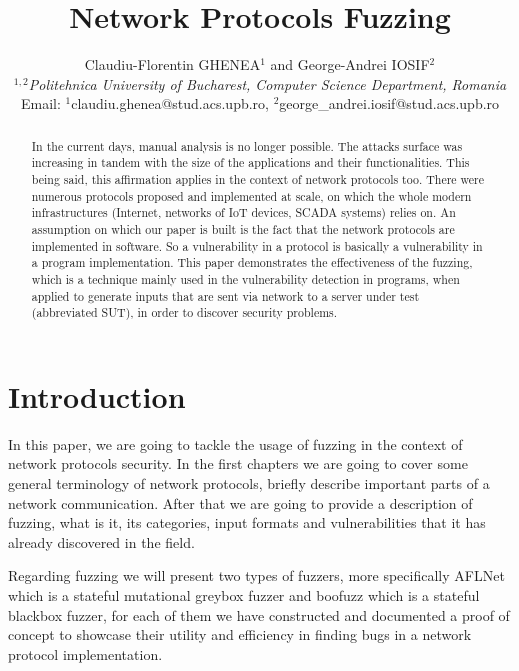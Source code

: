 \documentclass[10pt,a4paper,english,onecolumn]{IEEEtran}
\begin{document}
\title{Network Protocols Fuzzing}

\author{Claudiu-Florentin GHENEA$^{1}$ and George-Andrei IOSIF$^{2}$\\
$^{1,2}$\emph{Politehnica University of Bucharest, Computer Science Department, Romania}\\
Email: $^{1}$claudiu.ghenea@stud.acs.upb.ro, $^{2}$george\_andrei.iosif@stud.acs.upb.ro}

\maketitle

\begin{abstract}

In the current days, manual analysis is no longer possible. The attacks surface was increasing in tandem with the size of the applications and their functionalities. This being said, this affirmation applies in the context of network protocols too. There were numerous protocols proposed and implemented at scale, on which the whole modern infrastructures (Internet, networks of IoT devices, SCADA systems) relies on. An assumption on which our paper is built is the fact that the network protocols are implemented in software. So a vulnerability in a protocol is basically a vulnerability in a program implementation. This paper demonstrates the effectiveness of the fuzzing, which is a technique mainly used in the vulnerability detection in programs, when applied to generate inputs that are sent via network to a server under test (abbreviated SUT), in order to discover security problems.

\end{abstract}

\section{Introduction}

In this paper, we are going to tackle the usage of fuzzing in the context of network protocols security. In the first chapters we are going to cover some general terminology of network protocols, briefly describe important parts of a network communication. After that we are going to provide a description of fuzzing, what is it, its categories, input formats and vulnerabilities that it has already discovered in the field.

Regarding fuzzing we will present two types of fuzzers, more specifically AFLNet which is a stateful mutational greybox fuzzer and boofuzz which is a stateful blackbox fuzzer, for each of them we have constructed and documented a proof of concept to showcase their utility and efficiency in finding bugs in a network protocol implementation.
\end{document}
